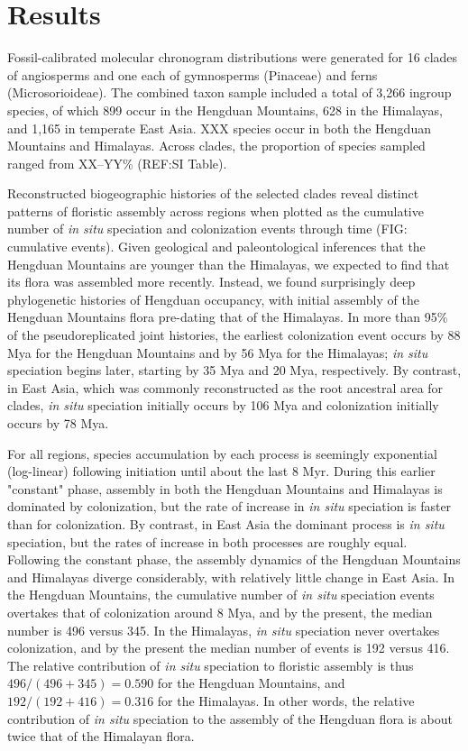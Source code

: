 \section{Results}

Fossil-calibrated molecular chronogram distributions were generated for 16 clades of angiosperms and one each of gymnosperms (Pinaceae) and ferns (Microsorioideae). The combined taxon sample included a total of 3,266 ingroup species, of which 899 occur in the Hengduan Mountains, 628 in the Himalayas, and 1,165 in temperate East Asia. XXX species occur in both the Hengduan Mountains and Himalayas. Across clades, the proportion of species sampled ranged from XX--YY\% (REF:SI Table).%

Reconstructed biogeographic histories of the selected clades reveal distinct patterns of floristic assembly across regions when plotted as the cumulative number of \textit{in situ} speciation and colonization events through time (FIG: cumulative events). Given geological and paleontological inferences that the Hengduan Mountains are younger than the Himalayas, we expected to find that its flora was assembled more recently. Instead, we found surprisingly deep phylogenetic histories of Hengduan occupancy, with initial assembly of the Hengduan Mountains flora pre-dating that of the Himalayas. In more than 95\% of the pseudoreplicated joint histories, the earliest colonization event occurs by 88 Mya for the Hengduan Mountains and by 56 Mya for the Himalayas; \textit{in situ} speciation begins later, starting by 35 Mya and 20 Mya, respectively. By contrast, in East Asia, which was commonly reconstructed as the root ancestral area for clades, \textit{in situ} speciation initially occurs by 106 Mya and colonization initially occurs by 78 Mya.

For all regions, species accumulation by each process is seemingly exponential (log-linear) following initiation until about the last 8 Myr. During this earlier "constant" phase, assembly in both the Hengduan Mountains and Himalayas is dominated by colonization, but the rate of increase in \textit{in situ} speciation is faster than for colonization. By contrast, in East Asia the dominant process is \textit{in situ} speciation, but the rates of increase in both processes are roughly equal. Following the constant phase, the assembly dynamics of the Hengduan Mountains and Himalayas diverge considerably, with relatively little change in East Asia. In the Hengduan Mountains, the cumulative number of \textit{in situ} speciation events overtakes that of colonization around 8 Mya, and by the present, the median number is 496 versus 345. In the Himalayas, \textit{in situ} speciation never overtakes colonization, and by the present the median number of events is 192 versus 416. The relative contribution of \textit{in situ} speciation to floristic assembly is thus $496/(496+345) = 0.590$ for the Hengduan Mountains, and $192/(192+416) = 0.316$ for the Himalayas. In other words, the relative contribution of \textit{in situ} speciation to the assembly of the Hengduan flora is about twice that of the Himalayan flora.

